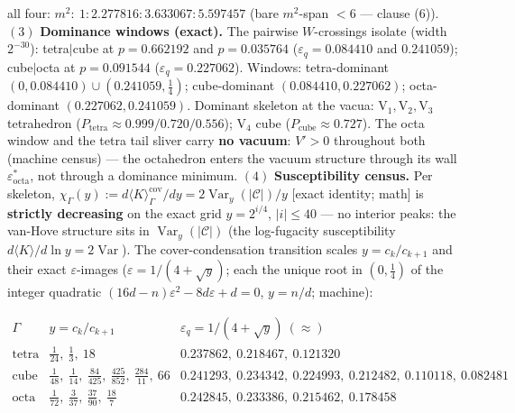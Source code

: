 \begin{theorem}
all four: $m^2:\ 1:2.277816:3.633067:5.597457$ (bare $m^2$-span $<6$ — clause (6)). $(3)$ \textbf{Dominance windows (exact).} The pairwise $W$-crossings isolate (width $2^{-30}$): tetra$|$cube at $p=0.662192$ and $p=0.035764$ ($\varepsilon_q=0.084410$ and $0.241059$); cube$|$octa at $p=0.091544$ ($\varepsilon_q=0.227062$). Windows: tetra-dominant $(0,0.084410)\cup(0.241059,\tfrac14)$; cube-dominant $(0.084410,0.227062)$; octa-dominant $(0.227062,0.241059)$. Dominant skeleton at the vacua: $\mathrm V_1,\mathrm V_2,\mathrm V_3$ tetrahedron ($P_{\mathrm{tetra}}\approx0.999/0.720/0.556$); $\mathrm V_4$ cube ($P_{\mathrm{cube}}\approx0.727$). The octa window and the tetra tail sliver carry \textbf{no vacuum}: $V'>0$ throughout both (machine census) — the octahedron enters the vacuum structure through its wall $\varepsilon^*_{\mathrm{octa}}$, not through a dominance minimum. $(4)$ \textbf{Susceptibility census.} Per skeleton, $\chi_\Gamma(y):=d\langle K\rangle^{\mathrm{cov}}_\Gamma/dy=2\operatorname{Var}_y(|\mathcal C|)/y$ [exact identity; math] is \textbf{strictly decreasing} on the exact grid $y=2^{i/4}$, $|i|\le40$ — no interior peaks: the van-Hove structure sits in $\operatorname{Var}_y(|\mathcal C|)$ (the log-fugacity susceptibility $d\langle K\rangle/d\ln y=2\operatorname{Var}$). The cover-condensation transition scales $y=c_k/c_{k+1}$ and their exact $\varepsilon$-images ($\varepsilon=1/(4+\sqrt y)$; each the unique root in $(0,\tfrac14)$ of the integer quadratic $(16d-n)\varepsilon^2-8d\varepsilon+d=0$, $y=n/d$; machine):

\[
\begin{array}{c|c|c}
\Gamma&y=c_k/c_{k+1}&\varepsilon_q=1/(4+\sqrt y)\ (\approx)\\ \hline
\text{tetra}&\tfrac1{24},\ \tfrac13,\ 18&0.237862,\ 0.218467,\ 0.121320\\
\text{cube}&\tfrac1{48},\ \tfrac1{14},\ \tfrac{84}{425},\ \tfrac{425}{852},\ \tfrac{284}{11},\ 66&0.241293,\ 0.234342,\ 0.224993,\ 0.212482,\ 0.110118,\ 0.082481\\
\text{octa}&\tfrac1{72},\ \tfrac3{37},\ \tfrac{37}{90},\ \tfrac{18}7&0.242845,\ 0.233386,\ 0.215462,\ 0.178458
\end{array}
\]


\end{theorem}
